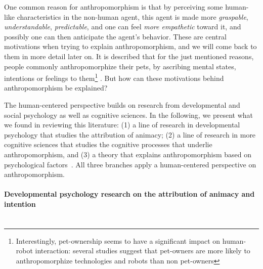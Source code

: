 \documentclass{frontiersSCNS} %
\begin{document}
One common reason for anthropomorphism is that by perceiving some human-like characteristics in the non-human agent, this agent is made more \emph{graspable}, \emph{understandable}, \emph{predictable}, and one can feel \emph{more empathetic} toward it, and possibly one can then anticipate the agent's behavior. These are central motivations when trying to explain anthropomorphism, and we will come back to them in more detail later on. 
It is described that for the just mentioned reasons, people commonly anthropomorphize their pets, by ascribing mental states, intentions or feelings to them\footnote{Interestingly, pet-ownership seems to have a significant impact on human-robot interaction: several studies suggest that pet-owners are more likely to anthropomorphize technologies and robots than non pet-owners} \cite{eddy_attribution_1993}. But how can these motivations behind anthropomorphism be explained?






The human-centered perspective builds on research from developmental and social psychology as well as cognitive sciences.  In the following, we present what we found in reviewing this literature: (1) a line of research in developmental psychology that studies the attribution of animacy; (2) a line of research in more cognitive sciences that studies the cognitive processes that underlie anthropomorphism, and (3) a theory that explains anthropomorphism based on psychological factors~\citep{epley_seeing_2007}. All three branches apply a human-centered perspective on anthropomorphism.


\paragraph*{Developmental psychology research on the attribution of animacy and intention\\ \\}
\end{document}
